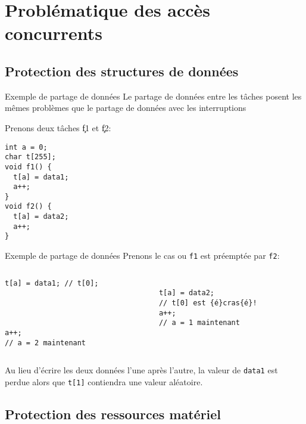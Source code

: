 \section{Problématique des accès concurrents}

\subsection{Protection des structures de données}

\begin{frame}[fragile]{Exemple de partage de données}
  Le partage de données entre les tâches posent les mêmes problèmes que
  le partage de données avec les interruptions

  Prenons deux tâches \c{f1} et \c{f2}:
  \begin{lstlisting}
int a = 0;
char t[255];
void f1() {
  t[a] = data1;
  a++;
}
void f2() {
  t[a] = data2;
  a++;
}
       \end{lstlisting}
\end{frame}

\begin{frame}[fragile]{Exemple de partage de données}
Prenons le cas ou \verb+f1+ est préemptée par \verb+f2+:
  \begin{columns}
    \begin{column}{5cm}
      \begin{lstlisting}[showlines=true,emptylines=10]
t[a] = data1; // t[0];




a++;
// a = 2 maintenant
       \end{lstlisting}
     \end{column}
     \begin{column}{5cm}
      \begin{lstlisting}[showlines=true,emptylines=10,escapeinside=\{\}]

t[a] = data2;
// t[0] est {é}cras{é}!
a++;
// a = 1 maintenant


       \end{lstlisting}
    \end{column}
  \end{columns}

  Au lieu d'écrire  les deux données l'une après  l'autre, la valeur de
  \verb+data1+ est perdue alors  que \verb+t[1]+ contiendra une valeur
  aléatoire.
\end{frame}

\subsection{Protection des ressources matériel}

